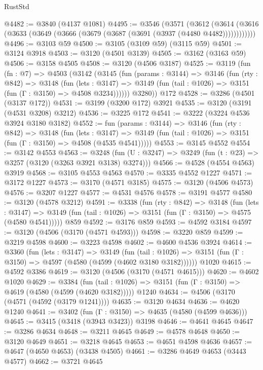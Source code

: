 \begin{lexlean}{RustStd}
\begin{coremodule}
{\begin{coremodule}
{{{{{{{{{{{{{{{{{{{{{{{{{{@4482 := @3840 (@4137 @1081)
@4495 := @3546
    (@3571
      (@3612 (@3614 (@3616 (@3633 (@3649 (@3666 (@3679 (@3687 (@3691 (@3937 (@4480 @4482))))))))))))
@4496 := @3103 @59
@4500 := @3105 (@3109 @59) (@3115 @59)
@4501 := @3124 @3918
@4503 := @3120 (@4501 @3139)
@4505 := @3162 (@3163 @59)
@4506 := @3158 @4505
@4508 := @3120 (@4506 @3187)
@4525 := @3119
    (fun (fn : @7) =>
    @4503
      (@3142
        (@3145
          (fun (params : @3144) =>
          @3146
            (fun (rty : @842) =>
            @3148
              (fun (lets : @3147) =>
              @3149 (fun (tail : @1026) => @3151 (fun (Γ : @3150) => @4508 @3234))))))
        @3280))
    @172
@4528 := @3286 (@4501 (@3137 @172))
@4531 := @3199 (@3200 @172) @3921
@4535 := @3120 (@3191 (@4531 @3208) @3212)
@4536 := @3225 @172
@4541 := @3222 (@3224 @4536 @3924 @3180 @3182)
@4552 := fun (params : @3144) =>
  @3146
    (fun (rty : @842) =>
    @3148
      (fun (lets : @3147) =>
      @3149 (fun (tail : @1026) => @3151 (fun (Γ : @3150) => @4508 (@4535 @4541)))))
@4553 := @3145 @4552
@4554 := @3142 @4553
@4563 := @3248 (fun (U : @3247) => @3249 (fun (t : @23) => @3257 (@3120 (@3263 @3921 @3138) @3274)))
@4566 := @4528 (@4554 @4563) @3919
@4568 := @3105 @4553 @4563
@4570 := @3335 @4552 @1227
@4571 := @3172 @1227
@4573 := @3170 (@4571 @3185)
@4575 := @3120 (@4506 @4573)
@4576 := @3207 @1227
@4577 := @4531 @4576
@4578 := @3191 @4577
@4580 := @3120 (@4578 @3212)
@4591 := @3338
    (fun (rty : @842) =>
    @3148
      (fun (lets : @3147) =>
      @3149 (fun (tail : @1026) => @3151 (fun (Γ : @3150) => @4575 (@4580 @4541)))))
    @859
@4592 := @3176 @859
@4593 := @4592 @3184
@4597 := @3120 (@4506 (@3170 (@4571 @4593)))
@4598 := @3220 @859
@4599 := @3219 @4598
@4600 := @3223 @4598
@4602 := @4600 @4536 @3924
@4614 := @3360
    (fun (lets : @3147) =>
    @3149
      (fun (tail : @1026) => @3151 (fun (Γ : @3150) => @4597 (@4580 (@4599 (@4602 @3180 @3182))))))
    @1020
@4615 := @4592 @3386
@4619 := @3120 (@4506 (@3170 (@4571 @4615)))
@4620 := @4602 @1020
@4629 := @3384
    (fun (tail : @1026) => @3151 (fun (Γ : @3150) => @4619 (@4580 (@4599 (@4620 @3182)))))
    @1240
@4634 := @4506 (@3170 (@4571 (@4592 (@3179 @1241))))
@4635 := @3120 @4634
@4636 := @4620 @1240
@4641 := @3402 (fun (Γ : @3150) => @4635 (@4580 (@4599 @4636)))
@4645 := @3415 (@3418 (@3943 @3423)) @3198
@4646 := @4641 @4645
@4647 := @3286 @4634
@4648 := @3211 @4645
@4649 := @4578 @4648
@4650 := @3120 @4649
@4651 := @3218 @4645
@4653 := @4651 @4598 @4636
@4657 := @4647 (@4650 @4653) (@3438 @4505)
@4661 := @3286 @4649 @4653 (@3443 @4577)
@4662 := @3721 @4645
}}}}}}}}}}}}}}}}}}}}}}}}}}
\end{coremodule}}
\end{coremodule}
\end{lexlean}
